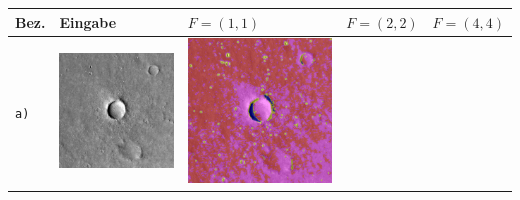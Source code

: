 \begin{table}[h!]
	\setlength\tabcolsep{0pt}
	\begin{tabularx}{\textwidth}{>{\centering}m{}
			>{\centering}m{}
			>{\centering}m{}
			>{\centering}m{}
			>{\centering\arraybackslash}m{}}
		\toprule
		
		Bez. &
		Eingabe & 
		$F=(1, 1)$ &
		$F=(2, 2)$ &
		$F=(4, 4)$ \\
		\midrule
		
		\texttt{a)} &
		\includegraphics[width=0.9\linewidth]{images/p03/p03_01.png} &
		\includegraphics[width=0.9\linewidth]{images/gen/pooling_layers/p03_01.png_1.png} &

\end{tabularx}
\end{table}
